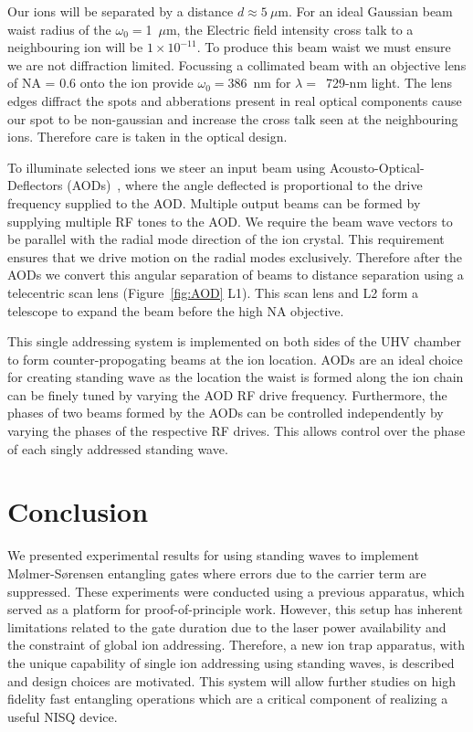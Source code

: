 \documentclass[12pt]{iopart}
\begin{document}
Our ions will be separated by a distance $d\approx 5~\mu$m. For an ideal
Gaussian beam waist radius of the $\omega_0 = $1~$\mu$m, the Electric
field intensity cross talk to a neighbouring ion will be
$1\times 10^{-11}$. To produce this beam waist we must ensure we are not
diffraction limited.  Focussing a collimated beam with an objective
lens of NA = 0.6 onto the ion provide $\omega_0 = 386$~nm for
$\lambda=$~729-nm light. The lens edges diffract the spots and
abberations present in real optical components cause our spot to be
non-gaussian and increase the cross talk seen at the neighbouring
ions. Therefore care is taken in the optical design.

To illuminate selected ions we steer an input beam using
Acousto-Optical-Deflectors (AODs)~\cite{nagourney_quantum_2014, li_low-crosstalk_2023, pogorelov_compact_2021}, where the
angle deflected is
proportional to the drive frequency supplied to the AOD. Multiple
output beams can be formed by supplying multiple RF tones to the AOD.
We require the beam wave vectors to be
parallel with the radial mode direction of the ion crystal. This
requirement ensures that we drive motion on the radial modes
exclusively. Therefore after the AODs we convert this angular
separation of beams to distance separation using a telecentric scan
lens (Figure~\ref{fig:AOD} L1).
This scan lens and L2 form a telescope to expand the beam before the
high NA objective.

This single addressing system is implemented on both sides of the UHV
chamber to form counter-propogating beams at the ion location. AODs are
an ideal choice for creating standing wave as the location the waist
is formed along the ion chain can be finely tuned by varying the AOD RF
drive frequency. Furthermore, the phases of two beams formed by the AODs can be
controlled independently by varying the phases of the respective RF
drives. This allows control over the phase of each singly addressed
standing wave.\\


\section{Conclusion}
We presented experimental results for using standing waves to
implement M\o lmer-S\o rensen entangling gates where errors due to the
carrier term are suppressed. These experiments were conducted using a
previous apparatus, which served as a platform for proof-of-principle
work. However, this setup has inherent limitations related to the gate
duration due to the laser power availability and the constraint of global
ion addressing.
Therefore, a new ion trap apparatus, with the unique capability of
single ion addressing using standing waves, is described and design
choices are motivated. This system will allow further studies on high
fidelity fast entangling operations which are a critical component of
realizing a useful NISQ device.
\end{document}
